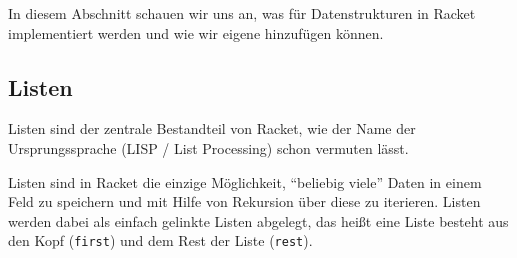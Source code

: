 
In diesem Abschnitt schauen wir uns an, was für Datenstrukturen in Racket implementiert werden und wie wir eigene hinzufügen können.

\subsection{Listen}
	\label{sec:racket_lists}

	Listen sind der zentrale Bestandteil von Racket, wie der Name der Ursprungssprache (LISP / List Processing) schon vermuten lässt.
	
	Listen sind in Racket die einzige Möglichkeit, \enquote{beliebig viele} Daten in einem Feld zu speichern und mit Hilfe von Rekursion über diese zu iterieren. Listen werden dabei als einfach gelinkte Listen abgelegt, das heißt eine Liste besteht aus den Kopf (\texttt{first}) und dem Rest der Liste (\texttt{rest}).
	
